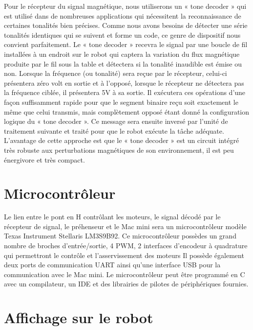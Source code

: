 Pour le récepteur du signal magnétique, nous utiliserons un « tone decoder » qui est utilisé dans de nombreuses applications qui nécessitent la reconnaissance de certaines tonalités bien précises. Comme nous avons besoins de détecter une série tonalités identiques qui se suivent et forme un code, ce genre de dispositif nous convient parfaitement. Le « tone decoder » recevra le signal par une boucle de fil installées à un endroit sur le robot qui captera la variation du flux magnétique produite par le fil sous la table et détectera si la tonalité inaudible est émise ou non. Lorsque la fréquence (ou tonalité) sera reçue par le récepteur, celui-ci présentera zéro volt en sortie et à l’opposé, lorsque le récepteur ne détectera pas la fréquence ciblée, il présentera 5V à sa sortie. Il exécutera ces opérations d’une façon suffisamment rapide pour que le segment binaire reçu soit exactement le même que celui transmis, mais complètement opposé étant donné la configuration logique du « tone decoder ».  Ce message sera ensuite inversé par l’unité de traitement suivante et traité pour que le robot exécute la tâche adéquate. L’avantage de cette approche est que le « tone decoder » est un circuit intégré très robuste aux perturbations magnétiques de son environnement, il est peu énergivore et très compact.

\section{Microcontrôleur} \label{s:micro}

Le lien entre le pont en H contrôlant les moteurs, le signal décodé par le récepteur de signal, le préhenseur et le Mac mini sera un microcontrôleur modèle Texas Instrument Stellaris LM3S9B92. Ce microcontrôleur possèdes un grand nombre de broches d'entrée/sortie, 4 PWM, 2 interfaces d'encodeur à quadrature qui permettront le contrôle et l'asservissement des moteurs Il possède également deux ports de communication UART ainsi qu'une interface USB pour la communication avec le Mac mini. Le microcontrôleur peut être programmé en C avec un compilateur, un IDE et des librairies de pilotes de périphériques fournies.   

\section{Affichage sur le robot} \label{s:LCD}

